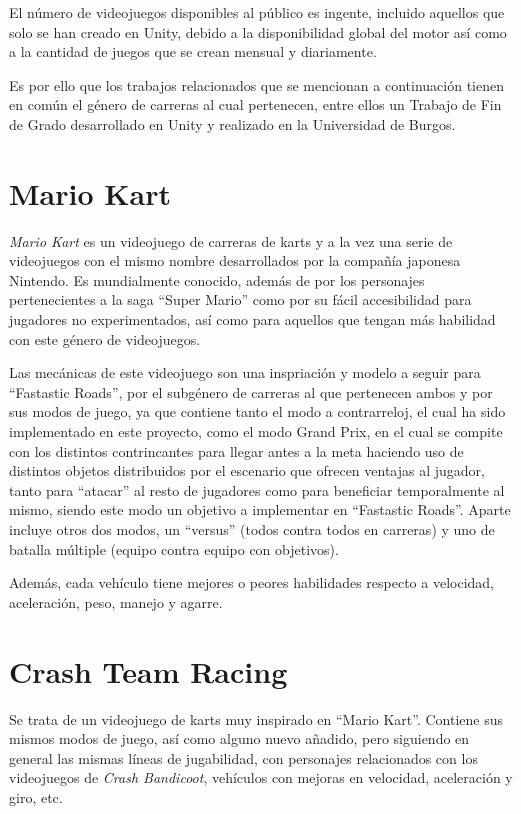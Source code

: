 
El número de videojuegos disponibles al público es ingente, incluido aquellos que solo se han creado en Unity, debido a la disponibilidad global del motor así como a la cantidad de juegos que se crean mensual y diariamente.

Es por ello que los trabajos relacionados que se mencionan a continuación tienen en común el género de carreras al cual pertenecen, entre ellos un Trabajo de Fin de Grado desarrollado en Unity y realizado en la Universidad de Burgos.

\section{Mario Kart}

\textit{Mario Kart} es un videojuego de carreras de karts y a la vez una serie de videojuegos con el mismo nombre desarrollados por la compañía japonesa Nintendo. Es mundialmente conocido, además de por los personajes pertenecientes a la saga ``Super Mario'' como por su fácil accesibilidad para jugadores no experimentados, así como para aquellos que tengan más habilidad con este género de videojuegos.

Las mecánicas de este videojuego son una inspriación y modelo a seguir para ``Fastastic Roads'', por el subgénero de carreras al que pertenecen ambos y por sus modos de juego, ya que contiene tanto el modo a contrarreloj, el cual ha sido implementado en este proyecto, como el modo Grand Prix, en el cual se compite con los distintos contrincantes para llegar antes a la meta haciendo uso de distintos objetos distribuidos por el escenario que ofrecen ventajas al jugador, tanto para ``atacar'' al resto de jugadores como para beneficiar temporalmente al mismo, siendo este modo un objetivo a implementar en ``Fastastic Roads''. Aparte incluye otros dos modos, un ``versus'' (todos contra todos en carreras) y uno de batalla múltiple (equipo contra equipo con objetivos).

Además, cada vehículo tiene mejores o peores habilidades respecto a velocidad, aceleración, peso, manejo y agarre.

\section{Crash Team Racing}

Se trata de un videojuego de karts muy inspirado en ``Mario Kart''. Contiene sus mismos modos de juego, así como alguno nuevo añadido, pero siguiendo en general las mismas líneas de jugabilidad, con personajes relacionados con los videojuegos de \textit{Crash Bandicoot}, vehículos con mejoras en velocidad, aceleración y giro, etc.

